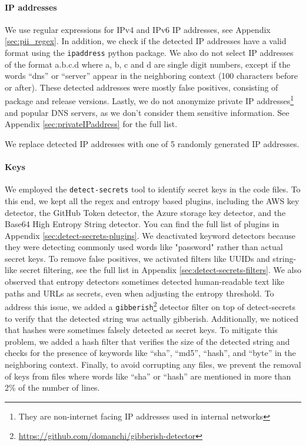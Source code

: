 \documentclass[10pt]{article} \usepackage{iclr2023_conference,times}
\begin{document}
\paragraph{IP addresses} We use regular expressions for IPv4 and IPv6 IP addresses, see Appendix \ref{sec:pii_regex}. In addition, we check if the detected IP addresses have a valid format using the \texttt{ipaddress} python package. We also do not select IP addresses of the format a.b.c.d where a, b, c and d are single digit numbers, except if the words “dns” or “server” appear in the neighboring context (100 characters before or after). These detected addresses were mostly false positives, consisting of package and release versions. Lastly, we do not anonymize private IP addresses\footnote{They are non-internet facing IP addresses used in internal networks} and popular DNS servers, as we don’t consider them sensitive information. See Appendix \ref{sec:privateIPaddress} for the full list. 

We replace detected IP addresses with one of 5 randomly generated IP addresses. 

\paragraph{Keys} We employed the \texttt{detect-secrets} tool to identify secret keys in the code files. To this end, we kept all the regex and entropy based plugins, including the AWS key detector, the GitHub Token detector, the Azure storage key detector, and the Base64 High Entropy String detector.
You can find the full list of plugins in Appendix \ref{sec:detect-secrets-plugins}. We deactivated keyword detectors because they were detecting commonly used words like "password" rather than actual secret keys. To remove false positives, we activated filters like UUIDs and string-like secret filtering, see the full list in Appendix \ref{sec:detect-secrets-filters}. We also observed that entropy detectors sometimes detected human-readable text like paths and URLs as secrets, even when adjusting the entropy threshold. To address this issue, we added a \texttt{gibberish}\footnote{\url{https://github.com/domanchi/gibberish-detector}} detector filter on top of detect-secrets to verify that the detected string was actually gibberish. Additionally, we noticed that hashes were sometimes falsely detected as secret keys. To mitigate this problem, we added a hash filter that verifies the size of the detected string and checks for the presence of keywords like ``sha'', ``md5'', ``hash'', and ``byte'' in the neighboring context. Finally, to avoid corrupting any files, we prevent the removal of keys from files where words like ``sha'' or ``hash'' are mentioned in more than 2\% of the number of lines.
\end{document}
